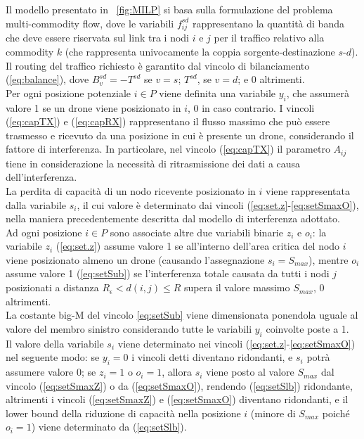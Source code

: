 Il modello presentato in \figurename\ \ref{fig:MILP} si basa sulla formulazione del problema multi-commodity flow, dove le variabili $f^{sd}_{ij}$ rappresentano la quantità di banda che deve essere riservata sul link tra i nodi $i$ e $j$ per il traffico relativo alla commodity $k$ (che rappresenta univocamente la coppia sorgente-destinazione $s$-$d$). 
Il routing del traffico richiesto è garantito dal vincolo di bilanciamento (\ref{eq:balance}), dove $B^{sd}_{v} = - T^{sd}$ se $v = s$; $T^{sd}$, se $v = d$; e 0 altrimenti. \\
Per ogni posizione potenziale $i \in P$ viene definita una variabile $y_i$, che assumerà valore 1 se un drone viene posizionato in $i$, 0 in caso contrario.   
I vincoli (\ref{eq:capTX}) e (\ref{eq:capRX}) rappresentano il flusso massimo che può essere trasmesso e ricevuto da una posizione in cui è presente un drone, considerando il fattore di interferenza. In particolare, nel vincolo (\ref{eq:capTX}) il parametro $A_{ij}$ tiene in considerazione la necessità di ritrasmissione dei dati a causa dell'interferenza.\\
La perdita di capacità di un nodo ricevente posizionato in $i$ viene rappresentata dalla variabile $s_i$, il cui valore è determinato dai vincoli (\ref{eq:set.z}-\ref{eq:setSmaxO}), nella maniera precedentemente descritta dal modello di interferenza adottato. \\
Ad ogni posizione $i \in P$ sono associate altre due variabili binarie $z_i$ e $o_i$: la variabile $z_i$ (\ref{eq:set.z}) assume valore 1 se all'interno dell'area critica del nodo $i$ viene posizionato almeno un drone (causando l'assegnazione $s_i = S_{max}$), mentre $o_i$ assume valore 1 (\ref{eq:setSub}) se l'interferenza totale causata da tutti i nodi $j$ posizionati a distanza $R_\epsilon < d(i,j) \leq R$ supera il valore massimo $S_{max}$, 0 altrimenti. \\
La costante big-M del vincolo \ref{eq:setSub} viene dimensionata ponendola uguale al valore del membro sinistro considerando tutte le variabili $y_i$ coinvolte poste a 1.\\ 
Il valore della variabile $s_i$ viene determinato nei vincoli (\ref{eq:set.z}-\ref{eq:setSmaxO}) nel seguente modo: se $y_i = 0$ i vincoli detti diventano ridondanti, e $s_i$ potrà assumere valore 0; se $z_i = 1$ o $o_i = 1$, allora $s_i$ viene posto al valore $S_{max}$ dal vincolo (\ref{eq:setSmaxZ}) o da (\ref{eq:setSmaxO}), rendendo (\ref{eq:setSlb}) ridondante, altrimenti i vincoli (\ref{eq:setSmaxZ}) e (\ref{eq:setSmaxO}) diventano ridondanti, e il lower bound della riduzione di capacità nella posizione $i$ (minore di $S_{max}$ poiché $o_i = 1$) viene determinato da (\ref{eq:setSlb}).  \\

